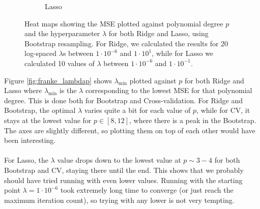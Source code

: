 \documentclass[a4paper]{article}
\begin{document}
\begin{figure}[H]
\begin{subfigure}{0.49\textwidth}
    \caption{Lasso}
  \end{subfigure}
  \caption{Heat maps showing the MSE plotted against polynomial degree $p$ and the hyperparameter $\lambda$ for both Ridge and Lasso, using Bootstrap resampling. For Ridge, we calculated the results for 20 log-spaced $\lambda$s between $1\cdot10^{-6}$ and $1\cdot10^{1}$, while for Lasso we calculated 10 values of $\lambda$ between $1\cdot10^{-6}$ and $1\cdot10^{-1}$.}
  \label{fig:franke_heatmap}
\end{figure}
Figure \ref{fig:franke_lambdap} shows $\lambda_{\text{min}}$ plotted against $p$ for both Ridge and Lasso where $\lambda_{\text{min}}$ is the $\lambda$ corresponding to the lowest MSE for that polynomial degree. This is done both for Bootstrap and Cross-validation. For Ridge and Bootstrap, the optimal $\lambda$ varies quite a bit for each value of $p$, while for CV, it stays at the lowest value for $p \in [8, 12]$, where there is a peak in the Bootstrap. The axes are slightly different, so plotting them on top of each other would have been interesting.\\\\
For Lasso, the $\lambda$ value drops down to the lowest value at $p\sim3-4$ for both Bootstrap and CV, staying there until the end. This shows that we probably should have tried running with even lower values. Running with the starting point $\lambda = 1\cdot10^{-6}$ took extremely long time to converge (or just reach the maximum iteration count), so trying with any lower is not very tempting. 
\end{document}
